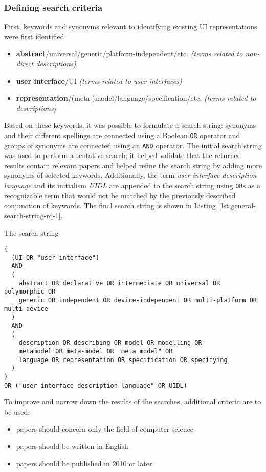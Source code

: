 \subsubsection{Defining search criteria}
First, keywords and synonyms relevant to identifying existing UI representations were first identified:
\begin{itemize}
    \item \textbf{abstract}/universal/generic/platform-independent/etc. \textit{(terms related to non-direct descriptions)}
    \item \textbf{user interface}/UI \textit{(terms related to user interfaces)}
    \item \textbf{representation}/(meta-)model/language/specification/etc. \textit{(terms related to descriptions)}
\end{itemize}
Based on these keywords, it was possible to formulate a search string: synonyms and their different spellings are connected using a Boolean \texttt{OR} operator and groups of synonyms are connected using an \texttt{AND} operator.
The initial search string was used to perform a tentative search;
it helped validate that the returned results contain relevant papers and helped refine the search string by adding more synonyms of selected keywords.
Additionally, the term \emph{user interface description language} and its initialism \emph{UIDL} are appended to the search string using \texttt{OR}s as a recognizable term that would not be matched by the previously described conjunction of keywords.
The final search string is shown in Listing~\ref{lst:general-search-string-rq-1}.
\begin{listing}
    \caption{The search string}
    \begin{verbatim}
(
  (UI OR "user interface")
  AND
  (
    abstract OR declarative OR intermediate OR universal OR polymorphic OR
    generic OR independent OR device-independent OR multi-platform OR multi-device
  )
  AND
  (
    description OR describing OR model OR modelling OR
    metamodel OR meta-model OR "meta model" OR
    language OR representation OR specification OR specifying
  )
)
OR ("user interface description language" OR UIDL)
    \end{verbatim}
    \label{lst:general-search-string-rq-1}
\end{listing}

To improve and narrow down the results of the searches, additional criteria are to be used:
\begin{samepage}
\begin{itemize}
    \item papers should concern only the field of computer science
    \item papers should be written in English
    \item papers should be published in 2010 or later
\end{itemize}
\end{samepage}

